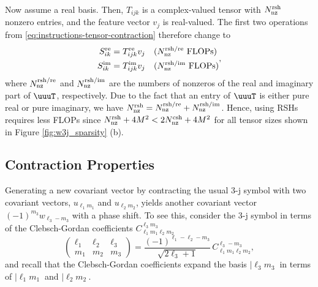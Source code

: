 Now assume a real basis.
Then, $T_{ijk}$ is a complex-valued tensor with $N_{\rm nz}^{\rm rsh}$ nonzero entries, and the feature vector $v_j$ is real-valued.
The first two operations from \eqref{eq:instructions-tensor-contraction} therefore change to
\begin{equation}
    \begin{aligned}
        S_{ik}^{\rm re} &= T_{ijk}^{\rm re} v_j && \text{($N_{\rm nz}^{\rm rsh/re}$ FLOPs)} \\
        S_{ik}^{\rm im} &= T_{ijk}^{\rm im} v_j && \text{($N_{\rm nz}^{\rm rsh/im}$ FLOPs)}
    \end{aligned}
    ,
\end{equation}
where $N_{\rm nz}^{\rm rsh/re}$ and $N_{\rm nz}^{\rm rsh/im}$ are the numbers of nonzeros of the real and imaginary part of $\uuuT$, respectively.
Due to the fact that an entry of $\uuuT$ is either pure real or pure imaginary, we have $N_{\rm nz}^{\rm rsh} = N_{\rm nz}^{\rm rsh/re} + N_{\rm nz}^{\rm rsh/im}$.
Hence, using RSHs requires less FLOPs since $N_{\rm nz}^{\rm rsh} + 4M^2 < 2N_{\rm nz}^{\rm csh} + 4M^2$  for all tensor sizes shown in Figure \ref{fig:w3j_sparsity} (b).

\subsection{Contraction Properties}
\label{appdx:w3j_rsph_contraction_properties}

Generating a new covariant vector by contracting the usual 3-j symbol with two covariant vectors, $u_{\ell_1 m_1}$ and $u_{\ell_2 m_2}$, yields another covariant vector $(-1)^{m_3} w_{\ell_3 -m_3}$ with a phase shift.
To see this, consider the 3-j symbol in terms of the Clebsch-Gordan coefficients $C_{\ell_1m_1\ell_2m_2}^{\ell_3m_3}$
\begin{equation}
    \begin{pmatrix}
        \ell_1 & \ell_2 & \ell_3 \\ m_1 & m_2 & m_3
    \end{pmatrix}
    =
    \frac{(-1)^{\ell_1 - \ell_2 - m_3}}{\sqrt{2\ell_3 + 1}} \, C_{\ell_1m_1\ell_2m_2}^{\ell_3-m_3},
\end{equation}
and recall that the Clebsch-Gordan coefficients expand the basis $\vert \ell_3 m_3 \>$ in terms of $\vert \ell_1 m_1 \>$ and $\vert \ell_2 m_2 \>$.

